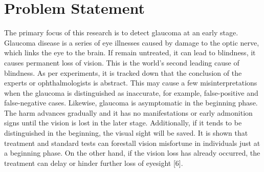 \section{Problem Statement} 
The primary focus of this research is to detect glaucoma at an early stage. Glaucoma disease is a series of eye illnesses caused by damage to the optic nerve, which links the eye to the brain. If remain untreated, it can lead to blindness, it causes permanent loss of vision. This is the world's second leading cause of blindness. As per experiments, it is tracked down that the conclusion of the experts or ophthalmologists is abstract. This may cause a few misinterpretations when the glaucoma is distinguished as inaccurate, for example, false-positive and false-negative cases. Likewise, glaucoma is asymptomatic in the beginning phase. The harm advances gradually and it has no manifestations or early admonition signs until the vision is lost in the later stage. Additionally, if it tends to be distinguished in the beginning, the visual sight will be saved. It is shown that treatment and standard tests can forestall vision misfortune in individuals just at a beginning phase. On the other hand, if the vision loss has already occurred, the treatment can delay or hinder further loss of eyesight [6].

